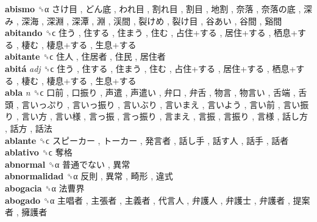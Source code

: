 \textbf{abismo} ␝α   さけ目 ,  どん底 ,  われ目 ,  割れ目 ,  割目 ,  地割 ,  奈落 ,  奈落の底 ,  深み ,  深海 ,  深淵 ,  深潭 ,  淵 ,  渓間 ,  裂けめ ,  裂け目 ,  谷あい ,  谷間 ,  谿間   \\
\textbf{abitando} ␝ϲ   住う ,  住する ,  住まう ,  住む ,  占住+する ,  居住+する ,  栖息+する ,  棲む ,  棲息+する ,  生息+する   \\
\textbf{abitante} ␝ϲ   住人 ,  住居者 ,  住民 ,  居住者   \\
\textbf{abitá} \emph{adj}  ␝ϲ   住う ,  住する ,  住まう ,  住む ,  占住+する ,  居住+する ,  栖息+する ,  棲む ,  棲息+する ,  生息+する   \\
\textbf{abla} \emph{n}  ␝ϲ   口前 ,  口振り ,  声遣 ,  声遣い ,  弁口 ,  弁舌 ,  物言 ,  物言い ,  舌端 ,  舌頭 ,  言いっぷり ,  言いっ振り ,  言いぶり ,  言いまえ ,  言いよう ,  言い前 ,  言い振り ,  言い方 ,  言い様 ,  言っ振 ,  言っ振り ,  言まえ ,  言振 ,  言振り ,  言様 ,  話し方 ,  話方 ,  話法   \\
\textbf{ablante} ␝ϲ   スピーカー ,  トーカー ,  発言者 ,  話し手 ,  話す人 ,  話手 ,  話者   \\
\textbf{ablativo} ␝ϲ   奪格   \\
\textbf{abnormal} ␝α   普通でない ,  異常   \\
\textbf{abnormalidad} ␝α   反則 ,  異常 ,  畸形 ,  違式   \\
\textbf{abogacia} ␝α   法曹界   \\
\textbf{abogado} ␝α   主唱者 ,  主張者 ,  主義者 ,  代言人 ,  弁護人 ,  弁護士 ,  弁護者 ,  提案者 ,  擁護者   \\
